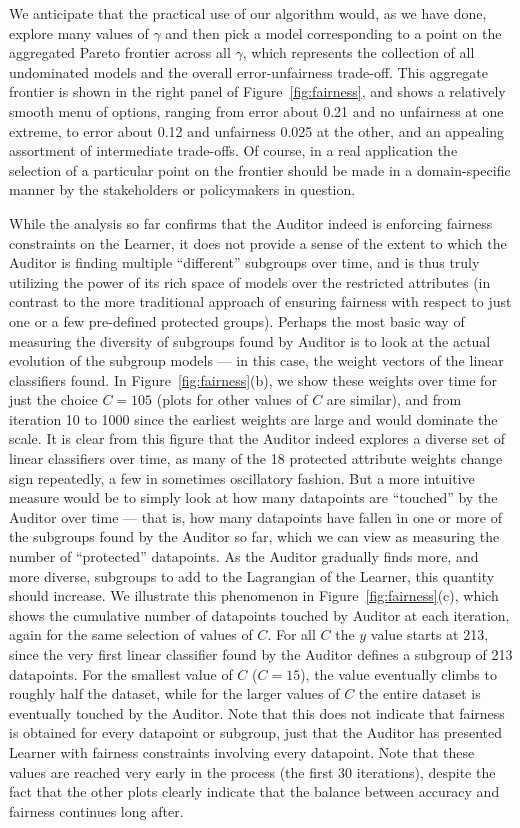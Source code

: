 We anticipate that the practical use of our algorithm would, as we have done,
explore many values of $\gamma$ and then pick a model corresponding to a point
on the aggregated Pareto frontier across all $\gamma$, which represents the collection
of all undominated models and the overall error-unfairness trade-off.
This aggregate frontier is shown in the right panel of
Figure~\ref{fig:fairness}, and shows a relatively smooth menu of options,
ranging from error about 0.21 and no unfairness at one extreme, to
error about 0.12 and unfairness 0.025 at the other, and an appealing
assortment of intermediate trade-offs. Of course, in a real application
the selection of a particular point on the frontier should be made in
a domain-specific manner by the stakeholders or policymakers in question.

\iffalse
While the analysis so far confirms that the Auditor indeed is enforcing fairness
constraints on the Learner, it does not provide a sense of the extent to which the
Auditor is finding multiple ``different'' subgroups over time, and is thus truly utilizing
the power of its rich space of models over the restricted attributes (in contrast to the more
traditional approach of ensuring fairness with respect to just one or a few pre-defined
protected groups). Perhaps the most basic way of measuring the diversity of subgroups found
by Auditor is to look at the actual evolution of the subgroup models --- in this case, the
weight vectors of the linear classifiers found. In Figure~\ref{fig:fairness}(b), we show
these weights over time for just the choice $C = 105$ (plots for other values of $C$ are
similar), and from iteration 10 to 1000 since the earliest weights are large and would dominate the
scale. It is clear from this figure that the Auditor indeed explores a diverse set of linear
classifiers over time, as many of the 18 protected attribute weights change sign repeatedly, a few
in sometimes oscillatory fashion.
But a more intuitive measure would be to simply look at how many datapoints are ``touched'' by the
Auditor over time --- that is, how many datapoints have fallen in one or more of the subgroups found
by the Auditor so far, which we can view as measuring the number of ``protected'' datapoints.
As the Auditor gradually finds more, and more diverse, subgroups to add to the Lagrangian of the
Learner, this quantity should increase. We illustrate this phenomenon in Figure~\ref{fig:fairness}(c),
which shows the cumulative number of datapoints touched by Auditor at each iteration, again for the
same selection of values of $C$. For all $C$ the $y$ value starts at 213, since the very first linear
classifier found by the Auditor defines a subgroup of 213 datapoints. For the smallest value of
$C$ ($C = 15$), the value eventually climbs to roughly half the dataset, while for the larger values of
$C$ the entire dataset is eventually touched by the Auditor. Note that this does not indicate that
fairness is obtained for every datapoint or subgroup, just that the Auditor has presented Learner
with fairness constraints involving every datapoint. Note that these values are reached very early
in the process (the first 30 iterations), despite the fact that the other plots clearly indicate that
the balance between accuracy and fairness continues long after.

